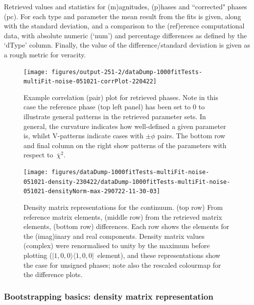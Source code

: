 \documentclass[10pt]{article}
\begin{document}
\begin{table}
\caption{{\label{tab:matE}Retrieved values and statistics for (m)agnitudes, (p)hases and ``corrected" phases (pc). For each type and parameter the mean result from the fits is given, along with the standard deviation, and a comparison to the (ref)erence computational data, with absolute numeric (`num') and percentage differences as defined by the `dType' column. Finally, the value of the difference/standard deviation is given as a rough metric for veracity.}}
\end{table}
\begin{figure}[H]
\begin{center}
\texttt{[image: figures/output-251-2/dataDump-1000fitTests-multiFit-noise-051021-corrPlot-220422]}
\caption{{Example correlation (pair) plot for retrieved phases. Note in this case
the reference phase (top left panel) has been set to 0 to illustrate
general patterns in the retrieved parameter sets. In general, the
curvature indicates how well-defined a given parameter is, whilst
V-patterns indicate cases with \(\pm\phi\) pairs. The bottom row
and final column on the right show patterns of the parameters with
respect to~\(\bar{\chi}^2\).
{\label{888108}}%
}}
\end{center}
\end{figure}
\begin{figure}[H]
\begin{center}
\texttt{[image: figures/dataDump-1000fitTests-multiFit-noise-051021-density-230422/dataDump-1000fitTests-multiFit-noise-051021-densityNorm-max-290722-11-30-03]}
\caption{{Density matrix representations for the continuum. (top row) From
reference matrix elements, (middle row) from the retrieved matrix
elements, (bottom row) differences. Each row shows the elements for the
(imag)inary and real components. Density matrix values (complex) were
renormalised to unity by the maximum before plotting
(\(|1,0,0\rangle \langle1,0,0|\)~element), and these representations show the case
for unsigned phases; note also the rescaled colourmap for the difference
plots.~
{\label{998904}}%
}}
\end{center}
\end{figure}

\subsubsection{Bootstrapping basics: density matrix representation\label{sec:den-mat-N2}}
\end{document}
